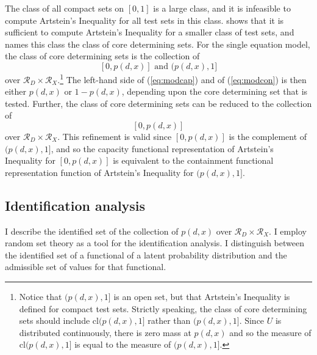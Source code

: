 \documentclass[12pt,a4paper,twoside]{article}
\numberwithin{equation}{section}
\newcommand{\Art}{Artstein's Inequality}
\begin{document}
The class of all compact sets on $[0,1]$ is a large class, and it is infeasible to compute {\Art} for all test sets in this class. \cite{crs13} shows that it is sufficient to compute {\Art} for a smaller class of test sets, and names this class the class of core determining sets. For the single equation model, the class of core determining sets is the collection of 
\[[0,p(d,x)]\text{ and }(p(d,x),1]\]
over $\mathcal{R}_D\times\mathcal{R}_X$.\footnote{Notice that $(p(d,x),1]$ is an open set, but that {\Art} is defined for compact test sets. Strictly speaking, the class of core determining sets should include $\text{cl}(p(d,x),1]$ rather than $(p(d,x),1]$. Since $U$ is distributed continuously, there is zero mass at $p(d,x)$ and so the measure of $\text{cl}(p(d,x),1]$ is equal to the measure of $(p(d,x),1]$.} The left-hand side of (\ref{eq:modcap}) and of (\ref{eq:modcon}) is then either $p(d,x)$ or $1-p(d,x)$, depending upon the core determining set that is tested. Further, the class of core determining sets can be reduced to the collection of
\[[0,p(d,x)]\]
over $\mathcal{R}_D\times\mathcal{R}_X$. This refinement is valid since $[0,p(d,x)]$ is the complement of $(p(d,x),1]$, and so the capacity functional representation of {\Art} for $[0,p(d,x)]$ is equivalent to the containment functional representation function of {\Art} for $(p(d,x),1]$.
\subsection{Identification analysis}
I describe the identified set of the collection of $p(d,x)$ over $\mathcal{R}_D\times\mathcal{R}_X$. I employ random set theory as a tool for the identification analysis. I distinguish between the identified set of a functional of a latent probability distribution and the admissible set of values for that functional.
\end{document}
